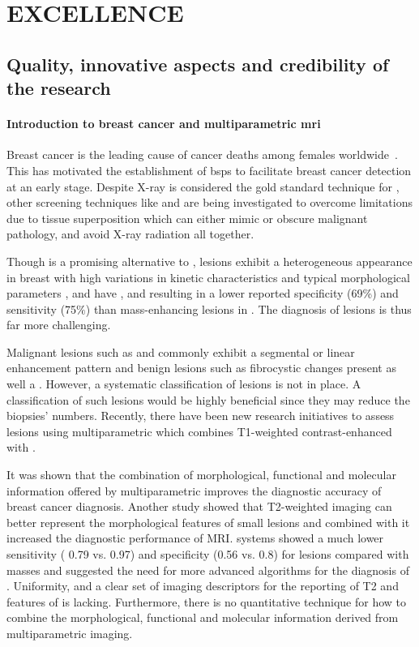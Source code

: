 \section{EXCELLENCE}
\label{sec:excellence}

\subsection{Quality, innovative aspects and credibility of the research}
\label{sec:quality}
\paragraph{Introduction to breast cancer and multiparametric \acs{mri}}

Breast cancer is the leading cause of cancer deaths among females
worldwide~\cite{cancerStatistics2011}. This has motivated the establishment of
\acp{bsp} to facilitate breast cancer detection at an early stage. Despite
X-ray \dm is considered the gold standard technique for \bsp, other screening
techniques like \us and \mri are being investigated to overcome \dm limitations
due to tissue superposition which can either mimic or obscure malignant
pathology, and avoid X-ray radiation all together.

Though \mri is a promising alternative to \dm, \nmle lesions exhibit
a heterogeneous appearance in breast \mri with high variations in kinetic
characteristics and typical morphological parameters
\cite{rosen2007birads,skamato2008categorization,yabuuchi2010nmle}, and have
, and resulting in a lower reported specificity (69\%) and sensitivity
(75$\%$) than mass-enhancing lesions\cite{Vag} in \cemri.  The diagnosis of
\nmle lesions is thus far more challenging.

Malignant lesions such as \dci and \ilc commonly exhibit a segmental or linear
enhancement pattern and benign lesions such as fibrocystic changes present as
well a \nmle \cite{Vag}.  However, a systematic classification of \nmle
lesions is not in place. A classification of such lesions would be highly
beneficial since they may reduce the biopsies’ numbers.  Recently, there have
been new research initiatives to assess \nmle lesions using multiparametric
\mri which combines T1-weighted contrast-enhanced \mri with \dwi {}.

It was shown that the combination of morphological, functional and molecular
information offered by multiparametric \mri improves the diagnostic accuracy of
breast cancer diagnosis.  Another study showed that T2-weighted imaging can
better represent the morphological features of small lesions 
and combined with \dwi it increased the diagnostic performance of MRI.  \cad
systems showed a much lower sensitivity ( 0.79 vs.
0.97) and specificity (0.56 vs. 0.8) for \nmle lesions compared with masses and
suggested the need for more advanced algorithms for the diagnosis of \nmle
\cite{Newell,Vag,Jansen1,Jansen2}.  Uniformity, and a clear set of
imaging descriptors for the reporting of T2 and \dwi features of \nmle is
lacking. Furthermore, there is no quantitative technique for how to combine the
morphological, functional and molecular information derived from
multiparametric imaging.



